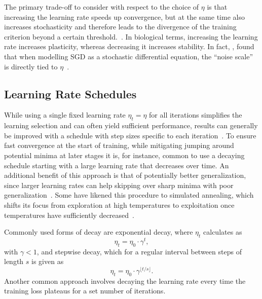 \documentclass[letterpaper]{article} %
\begin{document}
The primary trade-off to consider with respect to the choice of $\eta$ is that increasing the learning rate speeds up convergence, but at the same time also increases stochasticity and therefore leads to the divergence of the training criterion beyond a certain threshold.~\cite{bengioPracticalRecommendationsGradientbased2012}.
In biological terms, increasing the learning rate increases plasticity, whereas decreasing it increases stability.
In fact, \citet{smithBayesianPerspectiveGeneralization2018}, found that when modelling SGD as a stochastic differential equation, the “noise scale” is directly tied to $\eta$~\cite{smithBayesianPerspectiveGeneralization2018}.

\subsection{Learning Rate Schedules}

While using a single fixed learning rate $\eta_t = \eta$ for all iterations simplifies the learning selection and can often yield sufficient performance, results can generally be improved with a schedule with step sizes specific to each iteration~\cite{wuDemystifyingLearningRate2019b}.
To ensure fast convergence at the start of training, while mitigating jumping around potential minima at later stages it is, for instance, common to use a decaying schedule starting with a large learning rate that decreases over time.
An additional benefit of this approach is that of potentially better generalization, since larger learning rates can help skipping over sharp minima with poor generalization~\cite{hochreiterFlatMinima1997,chaudhariEntropySGDBiasingGradient2017}.
Some have likened this procedure to simulated annealing, which shifts its focus from exploration at high temperatures to exploitation once temperatures have sufficiently decreased~\cite{smithDonDecayLearning2018}.

Commonly used forms of decay are exponential decay, where $\eta_{t}$ calculates as
\begin{equation}
	\eta_{t} = \eta_0 \cdot \gamma^t,
\end{equation}
with $\gamma < 1$, and stepwise decay, which for a regular interval between steps of length $s$ is given as
\begin{equation}
	\eta_{t} = \eta_0 \cdot \gamma^{\lfloor t/s \rfloor}.
\end{equation}
Another common approach involves decaying the learning rate every time the training loss plateaus for a set number of iterations.
\end{document}
